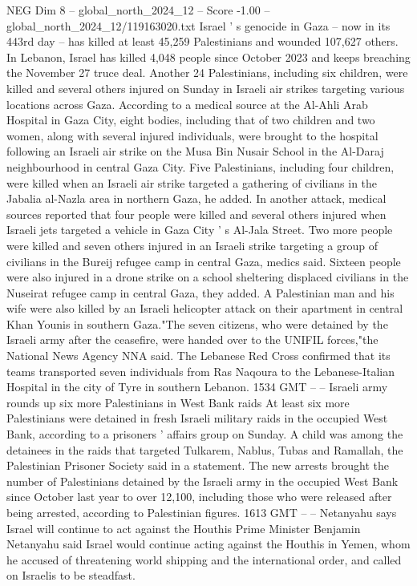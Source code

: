 \begin{textsample}{NEG Dim 8 – global\_north\_2024\_12 – Score -1.00 – global\_north\_2024\_12/119163020.txt}  \label{ex:f8_neg_352}
Israel ' s genocide in Gaza -- now in its 443rd day -- has killed at least 45,259 Palestinians and wounded 107,627 others.
In Lebanon, Israel has killed 4,048 people since October 2023 and keeps breaching the November 27 truce deal.
Another 24 Palestinians, including six children, were killed and several others injured on Sunday in Israeli air strikes targeting various locations across Gaza.
According to a medical source at the Al-Ahli Arab Hospital in Gaza City, eight bodies, including that of two children and two women, along with several injured individuals, were brought to the hospital following an Israeli air strike on the Musa Bin Nusair School in the Al-Daraj neighbourhood in central Gaza City.
Five Palestinians, including four children, were killed when an Israeli air strike targeted a gathering of civilians in the Jabalia al-Nazla area in northern Gaza, he added.
In another attack, medical sources reported that four people were killed and several others injured when Israeli jets targeted a vehicle in Gaza City ' s Al-Jala Street.
Two more people were killed and seven others injured in an Israeli strike targeting a group of civilians in the Bureij refugee camp in central Gaza, medics said.
Sixteen people were also injured in a drone strike on a school sheltering displaced civilians in the Nuseirat refugee camp in central Gaza, they added.
A Palestinian man and his wife were also killed by an Israeli helicopter attack on their apartment in central Khan Younis in southern Gaza."The seven citizens, who were detained by the Israeli army after the ceasefire, were handed over to the UNIFIL forces,"the National News Agency NNA said.
The Lebanese Red Cross confirmed that its teams transported seven individuals from Ras Naqoura to the Lebanese-Italian Hospital in the city of Tyre in southern Lebanon. 1534 GMT -- -- Israeli army rounds up six more Palestinians in West Bank raids At least six more Palestinians were detained in fresh Israeli military raids in the occupied West Bank, according to a prisoners ' affairs group on Sunday.
A child was among the detainees in the raids that targeted Tulkarem, Nablus, Tubas and Ramallah, the Palestinian Prisoner Society said in a statement.
The new arrests brought the number of Palestinians detained by the Israeli army in the occupied West Bank since October last year to over 12,100, including those who were released after being arrested, according to Palestinian figures. 1613 GMT -- -- Netanyahu says Israel will continue to act against the Houthis Prime Minister Benjamin Netanyahu said Israel would continue acting against the Houthis in Yemen, whom he accused of threatening world shipping and the international order, and called on Israelis to be steadfast.

\end{textsample}

